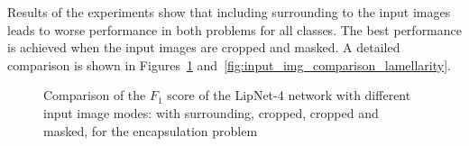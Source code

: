 \documentclass[a4paper, 11pt, table]{article}
\begin{document}
Results of the experiments show that including surrounding to the input images leads to worse performance in both problems for all classes. The best performance is achieved when the input images are cropped and masked. A detailed comparison is shown in Figures~\ref{fig:input_img_comparison_encapsulation} and~\ref{fig:input_img_comparison_lamellarity}.

\begin{figure}[H]
\centering


\caption{\label{fig:input_img_comparison_encapsulation}Comparison of the $F_1$ score of the LipNet-4 network with different input image modes: with surrounding, cropped, cropped and masked, for the encapsulation problem}
\end{figure}
\end{document}
